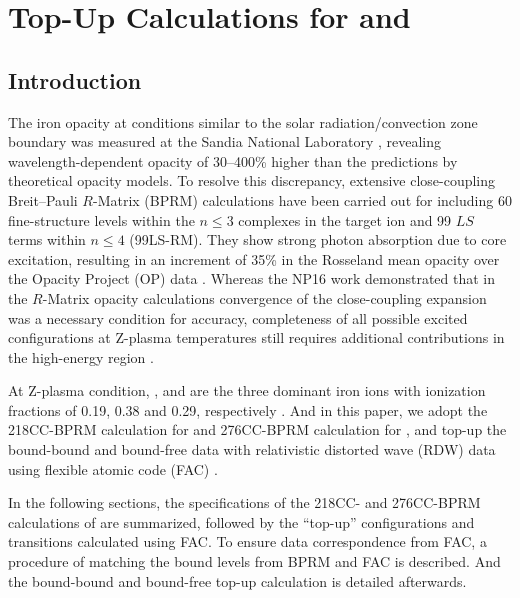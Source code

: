 \chapter{Top-Up Calculations for  and } \label{chap_topup}

\section{Introduction}

The iron opacity at conditions similar to the solar radiation/convection zone boundary was measured at the Sandia National Laboratory \citep{sandia_2015}, revealing wavelength-dependent opacity of 30--400\% higher than the predictions by theoretical opacity models.
To resolve this discrepancy, extensive close-coupling Breit--Pauli $R$-Matrix (BPRM) calculations have been carried out for  including 60 fine-structure levels within the $n\leq 3$ complexes in the  target ion \citep[60CC-BPRM,][]{60cc_2011} and 99 $LS$ terms within $n\leq 4$ (99LS-RM). They show strong photon absorption due to core excitation, resulting in an increment of 35\% in the Rosseland mean opacity over the Opacity Project (OP) data \citep [][hereafter NP16]{99cc_2016}. Whereas the NP16 work demonstrated that in the $R$-Matrix opacity calculations convergence of the close-coupling expansion was a necessary condition for accuracy, completeness of all possible excited configurations at Z-plasma temperatures still requires additional contributions in the high-energy region \citep{comment_2016, comment_2016a, more_comment_2017}.

At Z-plasma condition,  ,  and  are the three dominant iron ions with ionization fractions of 0.19, 0.38 and 0.29, respectively \citep{99cc_2016}. And in this paper, we adopt the 218CC-BPRM calculation for  and 276CC-BPRM calculation for  \citep{rmop_2}, and top-up the bound-bound and bound-free data with relativistic distorted wave (RDW) data using flexible atomic code (FAC) \citep{gu_2008}.

In the following sections, the specifications of the 218CC- and 276CC-BPRM calculations of \citet{rmop_2} are summarized, followed by the ``top-up'' configurations and transitions calculated using FAC. To ensure data correspondence from FAC, a procedure of matching the bound levels from BPRM and FAC is described. And the bound-bound and bound-free top-up calculation is detailed afterwards. 


